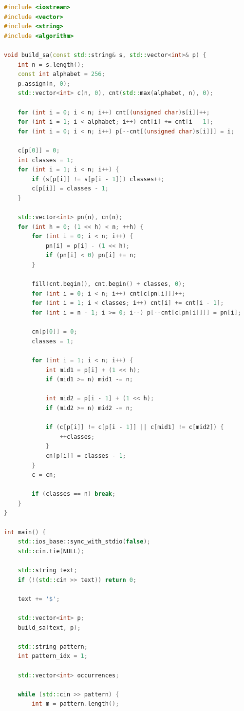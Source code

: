 \begin{lstlisting}[language=C++]
#include <iostream>
#include <vector>
#include <string>
#include <algorithm>

void build_sa(const std::string& s, std::vector<int>& p) {
    int n = s.length();
    const int alphabet = 256;
    p.assign(n, 0);
    std::vector<int> c(n, 0), cnt(std::max(alphabet, n), 0);

    for (int i = 0; i < n; i++) cnt[(unsigned char)s[i]]++;
    for (int i = 1; i < alphabet; i++) cnt[i] += cnt[i - 1];
    for (int i = 0; i < n; i++) p[--cnt[(unsigned char)s[i]]] = i;

    c[p[0]] = 0;
    int classes = 1;
    for (int i = 1; i < n; i++) {
        if (s[p[i]] != s[p[i - 1]]) classes++;
        c[p[i]] = classes - 1;
    }

    std::vector<int> pn(n), cn(n);
    for (int h = 0; (1 << h) < n; ++h) {
        for (int i = 0; i < n; i++) {
            pn[i] = p[i] - (1 << h);
            if (pn[i] < 0) pn[i] += n;
        }
        
        fill(cnt.begin(), cnt.begin() + classes, 0);
        for (int i = 0; i < n; i++) cnt[c[pn[i]]]++;
        for (int i = 1; i < classes; i++) cnt[i] += cnt[i - 1];
        for (int i = n - 1; i >= 0; i--) p[--cnt[c[pn[i]]]] = pn[i];

        cn[p[0]] = 0;
        classes = 1;

        for (int i = 1; i < n; i++) {
            int mid1 = p[i] + (1 << h);
            if (mid1 >= n) mid1 -= n;
            
            int mid2 = p[i - 1] + (1 << h);
            if (mid2 >= n) mid2 -= n;

            if (c[p[i]] != c[p[i - 1]] || c[mid1] != c[mid2]) {
                ++classes;
            }
            cn[p[i]] = classes - 1;
        }
        c = cn;

        if (classes == n) break;
    }
}

int main() {
    std::ios_base::sync_with_stdio(false);
    std::cin.tie(NULL);

    std::string text;
    if (!(std::cin >> text)) return 0;
    
    text += '$';

    std::vector<int> p;
    build_sa(text, p);

    std::string pattern;
    int pattern_idx = 1;

    std::vector<int> occurrences;
    
    while (std::cin >> pattern) {
        int m = pattern.length();


\end{lstlisting}
